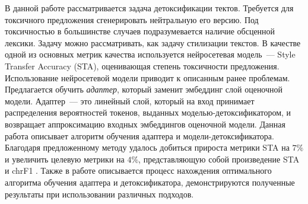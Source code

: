 В данной работе рассматривается задача детоксификации тектов.
Требуется для токсичного предложения сгенерировать нейтральную его версию. 
Под токсичностью в большинстве случаев подразумевается наличие обсценной лексики.
Задачу можно рассматривать, как задачу стилизации текстов. 
В качестве одной из основных метрик качества используется нейросетевая модель~--- Style Transfer Accuracy (STA), оценивающая степень токсичности предложения. 
Использование нейросетевой модели приводит к описанным ранее проблемам. 
Предлагается обучить \textit{адаптер}, который заменит эмбеддинг слой оценочной модели.
Адаптер~--- это линейный слой, который на вход принимает распределения вероятностей токенов, выданных моделью-детоксификатором, и возвращает аппроксимацию входных эмбеддингов оценочной модели. 
Данная работа описывает алгоритм обучения адаптера и модели-детоксификатора.
Благодаря предложенному методу удалось добиться прироста метрики STA на $7\%$ и увеличить целевую метрики на $4\%$, представляющую собой произведение STA и chrF1 \cite{popovic-2015-chrf}.
Также в работе описывается процесс нахождения оптимального алгоритма обучения адаптера и детоксификатора, демонстрируются полученные результаты при использовании различных подходов.  